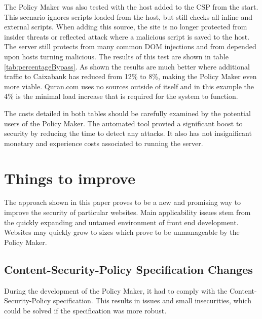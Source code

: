 The Policy Maker was also tested with the host added to the CSP from the start.
This scenario ignores scripts loaded from the host, but still checks all inline and external scripts.
When adding this source, the site is no longer protected from insider threats or reflected attack where a malicious script is saved to the host.
The server still protects from many common DOM injections and from depended upon hosts turning malicious.
The results of this test are shown in table \ref{tab:percentageBypass}.
As shown the results are much better where additional traffic to Caixabank has reduced from 12\% to 8\%, making the Policy Maker even more viable.
Quran.com uses no sources outside of itself and in this example the 4\% is the minimal load increase that is required for the system to function.


The costs detailed in both tables should be carefully examined by the potential users of the Policy Maker.
The automated tool provied a significant boost to security by reducing the time to detect any attacks.
It also has not insignificant monetary and experience costs associated to running the server.


\section{Things to improve}

The approach shown in this paper proves to be a new and promising way to improve the security of particular websites.
Main applicability issues stem from the quickly expanding and untamed environment of front end development.
Websites may quickly grow to sizes which prove to be unmanageable by the Policy Maker.

\subsection{Content-Security-Policy Specification Changes}

During the development of the Policy Maker, it had to comply with the Content-Security-Policy specification.
This results in issues and small insecurities, which could be solved if the specification was more robust.

